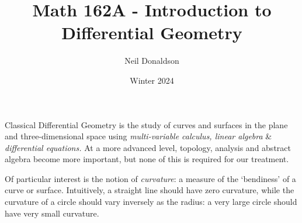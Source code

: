 \graphicspath{{curves/asy}}

\title{Math 162A - Introduction to Differential Geometry}
\author{Neil Donaldson}
\date{Winter 2024}
\maketitle

\thispagestyle{empty}


Classical Differential Geometry is the study of curves and surfaces in the plane and three-dimensional space using \emph{multi-variable calculus, linear algebra} \& \emph{differential equations.} At a more advanced level, topology, analysis and abstract algebra become more important, but none of this is required for our treatment.\bigbreak

Of particular interest is the notion of \emph{curvature}: a measure of the `bendiness' of a curve or surface. Intuitively, a straight line should have zero curvature, while the curvature of a circle should vary inversely as the radius: a very large circle should have very small curvature.

